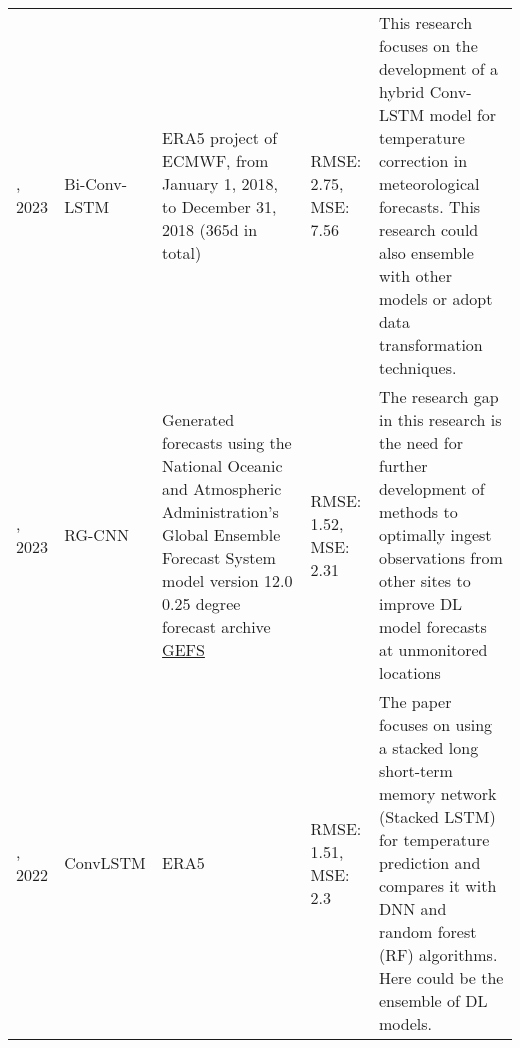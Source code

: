 {\begin{longtable}[c]{ p{} p{} p{} p{} p{} }
\cite{hao2023temperature}, 2023 & Bi-Conv-LSTM & ERA5 project of ECMWF, from January 1, 2018, to December 31, 2018 (365d in total) &RMSE: 2.75, MSE: 7.56 & This research focuses on the development of a hybrid Conv-LSTM model for temperature correction in meteorological forecasts. This research could also ensemble with other models or adopt data transformation techniques.\\
\cite{zwart2023evaluating}, 2023 & RG-CNN & Generated forecasts
using the National Oceanic and Atmospheric Administration's
Global Ensemble Forecast System model version 12.0 0.25 degree forecast archive \href{https://noaa-gefs-retrospective.
s3.amazonaws.com/index.html}{GEFS} &RMSE: 1.52, MSE: 2.31 & The research gap in this research is the need for further development of methods to optimally ingest observations from other sites to improve DL model forecasts at unmonitored locations\\

\cite{gong2022temperature}, 2022 & ConvLSTM & ERA5 &RMSE: 1.51, MSE: 2.3 & The paper focuses on using a stacked long short-term memory network (Stacked LSTM) for temperature prediction and compares it with DNN and random forest (RF) algorithms. Here could be the ensemble of DL models.\\
\hline
\end{longtable}}

